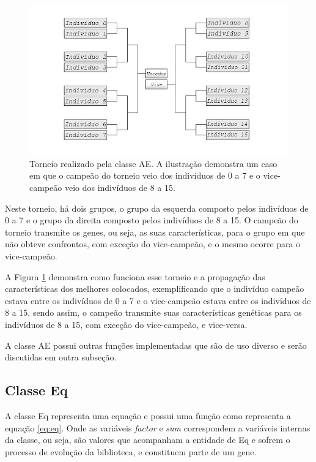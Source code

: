 \begin{figure}[htb]
    \caption{Torneio realizado pela classe AE. A ilustração demonstra um caso em que o campeão do torneio veio dos indivíduos de 0 a 7 e o vice-campeão veio dos indivíduos de 8 a 15.}
    \label{figura:funcao_playAll}
    \centering
    \includegraphics[scale=0.8]{images/ps/mata-mata}
    \fautor
\end{figure}

Neste torneio, há dois grupos, o grupo da esquerda composto pelos indivíduos de 0 a 7 e o grupo da direita composto pelos indivíduos de 8 a 15. O campeão do torneio transmite os genes, ou seja, as suas características, para o grupo em que não obteve confrontos, com exceção do vice-campeão, e o mesmo ocorre para o vice-campeão.

A Figura \ref{figura:funcao_playAll} demonstra como funciona esse torneio e a propagação das características dos melhores colocados, exemplificando que o indivíduo campeão estava entre os indivíduos de 0 a 7 e o vice-campeão estava entre os indivíduos de 8 a 15, sendo assim, o campeão transmite suas características genéticas para os indivíduos de 8 a 15, com exceção do vice-campeão, e vice-versa.

A classe AE possui outras funções implementadas que são de uso diverso e serão discutidas em outra subseção.

\subsection{Classe Eq}

\newcommand{\var}[1]{\textit{#1}}

A classe Eq representa uma equação e possui uma função como representa a equação \ref{eq:eq}. Onde as variáveis \var{factor} e \var{sum} correspondem a variáveis internas da classe, ou seja, são valores que acompanham a entidade de Eq e sofrem o processo de evolução da biblioteca, e constituem parte de um gene.

